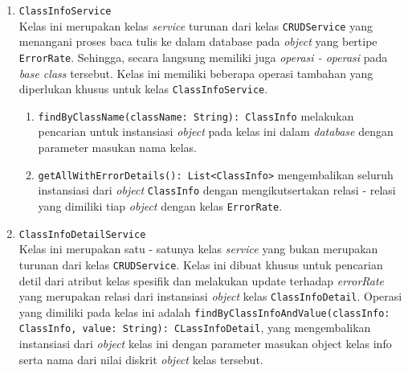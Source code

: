 \begin{enumerate}
	\item \texttt{ClassInfoService}\\
	Kelas ini merupakan kelas \textit{service} turunan dari kelas \texttt{CRUDService} yang menangani proses baca tulis ke dalam database pada \textit{object} yang bertipe \texttt{ErrorRate}. Sehingga, secara langsung memiliki juga \textit{operasi - operasi} pada \textit{base class} tersebut. Kelas ini memiliki beberapa operasi tambahan yang diperlukan khusus untuk kelas \texttt{ClassInfoService}.
	\begin{enumerate}
		\item \texttt{findByClassName(className: String): ClassInfo} melakukan pencarian untuk instansiasi \textit{object} pada kelas ini dalam \textit{database} dengan parameter masukan nama kelas.
		\item \texttt{getAllWithErrorDetails(): List<ClassInfo>} mengembalikan seluruh instansiasi dari \textit{object} \texttt{ClassInfo} dengan mengikutsertakan relasi - relasi yang dimiliki tiap \textit{object} dengan kelas \texttt{ErrorRate}.
	\end{enumerate}
	
	\item \texttt{ClassInfoDetailService}\\
	Kelas ini merupakan satu - satunya kelas \textit{service} yang bukan merupakan turunan dari kelas \texttt{CRUDService}. Kelas ini dibuat khusus untuk pencarian detil dari atribut kelas spesifik dan melakukan update terhadap \textit{errorRate} yang merupakan relasi dari instansiasi \textit{object} kelas \texttt{ClassInfoDetail}. Operasi yang dimiliki pada kelas ini adalah \texttt{findByClassInfoAndValue(classInfo: ClassInfo, value: String): CLassInfoDetail}, yang mengembalikan instansiasi dari \textit{object} kelas ini dengan parameter masukan object kelas info serta nama dari nilai diskrit \textit{object} kelas tersebut. 

\end{enumerate}

